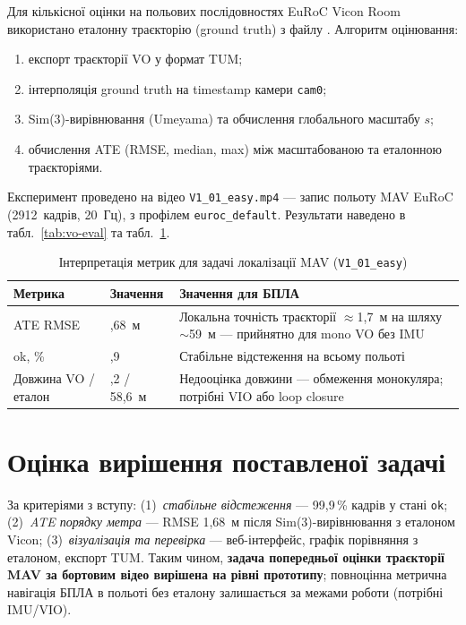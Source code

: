 \documentclass[14pt,a4paper,openany]{extreport}
\begin{document}
Для кількісної оцінки на польових послідовностях EuRoC Vicon Room
використано еталонну траєкторію (ground truth) з файлу
. Алгоритм оцінювання:
\begin{enumerate}[leftmargin=\parindent, itemsep=0pt]
  \item експорт траєкторії VO у формат TUM;
  \item інтерполяція ground truth на timestamp камери \texttt{cam0};
  \item Sim(3)-вирівнювання (Umeyama) та обчислення глобального масштабу $s$;
  \item обчислення ATE (RMSE, median, max) між масштабованою та еталонною траєкторіями.
\end{enumerate}

Експеримент проведено на відео \texttt{V1\_01\_easy.mp4} --- запис польоту MAV EuRoC (2912~кадрів, 20~Гц), з профілем \texttt{euroc\_default}. Результати наведено в табл.~\ref{tab:vo-eval} та табл.~\ref{tab:mav-interpret}.

\begin{table}[htbp]
  \caption{Інтерпретація метрик для задачі локалізації MAV (\texttt{V1\_01\_easy})}
  \label{tab:mav-interpret}
  \centering
  \small
  \begin{tabular}{|>{\raggedright\arraybackslash}p{3.2cm}|>{\raggedright\arraybackslash}p{2.2cm}|>{\raggedright\arraybackslash}p{6.8cm}|}
    \hline
    Метрика & Значення & Значення для БПЛА \\
    \hline
    ATE RMSE & 1,68~м & Локальна точність траєкторії $\approx$1,7~м на шляху $\sim$59~м --- прийнятно для mono VO без IMU \\
    \hline
    ok, \% & 99,9 & Стабільне відстеження на всьому польоті \\
    \hline
    Довжина VO / еталон & 26,2 / 58,6~м & Недооцінка довжини --- обмеження монокуляра; потрібні VIO або loop closure \\
    \hline
  \end{tabular}
\end{table}

\section{Оцінка вирішення поставленої задачі}

За критеріями з вступу: (1)~\emph{стабільне відстеження} --- 99,9\,\% кадрів у стані \texttt{ok}; (2)~\emph{ATE порядку метра} --- RMSE 1,68~м після Sim(3)-вирівнювання з еталоном Vicon; (3)~\emph{візуалізація та перевірка} --- веб-інтерфейс, графік порівняння з еталоном, експорт TUM. Таким чином, \textbf{задача попередньої оцінки траєкторії MAV за бортовим відео вирішена на рівні прототипу}; повноцінна метрична навігація БПЛА в польоті без еталону залишається за межами роботи (потрібні IMU/VIO).
\end{document}
